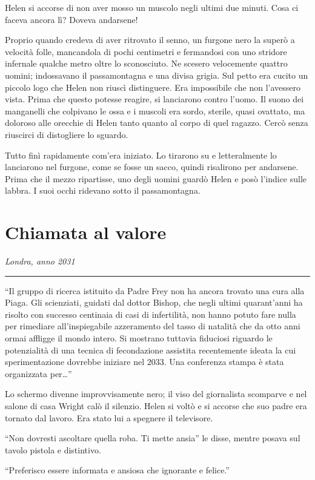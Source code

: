 \documentclass[a4paper,oneside,11pt]{memoir}
\begin{document}
Helen si accorse di non aver mosso un muscolo negli ultimi due minuti. Cosa ci faceva ancora lì?
Doveva andarsene!

Proprio quando credeva di aver ritrovato il senno, un furgone nero la superò a velocità folle,
mancandola di pochi centimetri e fermandosi con uno stridore infernale qualche metro oltre lo
sconosciuto. Ne scesero velocemente quattro uomini; indossavano il passamontagna e una divisa
grigia. Sul petto era cucito un piccolo logo che Helen non riuscì distinguere. Era impossibile che
non l'avessero vista. Prima che questo potesse reagire, si lanciarono contro l'uomo. Il suono dei
manganelli che colpivano le ossa e i muscoli era sordo, sterile, quasi ovattato, ma doloroso alle
orecchie di Helen tanto quanto al corpo di quel ragazzo. Cercò senza riuscirci di distogliere lo
sguardo.

Tutto finì rapidamente com'era iniziato. Lo tirarono su e letteralmente lo lanciarono nel furgone,
come se fosse un sacco, quindi risalirono per andarsene. Prima che il mezzo ripartisse, uno degli
uomini guardò Helen e posò l'indice sulle labbra. I suoi occhi ridevano sotto il passamontagna.

\chapter{Chiamata al valore}

\emph{Londra, anno 2031}
\plainbreak{1}

``Il gruppo di ricerca istituito da Padre Frey non ha ancora trovato una cura alla Piaga. Gli
scienziati, guidati dal dottor Bishop, che negli ultimi quarant'anni ha risolto con successo
centinaia di casi di infertilità, non hanno potuto fare nulla per rimediare all'inspiegabile
azzeramento del tasso di natalità che da otto anni ormai affligge il mondo intero. Si mostrano
tuttavia fiduciosi riguardo le potenzialità di una tecnica di fecondazione assistita recentemente
ideata la cui sperimentazione dovrebbe iniziare nel 2033. Una conferenza stampa è stata organizzata
per\dots''

Lo schermo divenne improvvisamente nero; il viso del giornalista scomparve e nel salone di casa
Wright calò il silenzio. Helen si voltò e si accorse che suo padre era tornato dal lavoro. Era stato
lui a spegnere il televisore.

``Non dovresti ascoltare quella roba. Ti mette ansia'' le disse, mentre posava sul tavolo pistola e
distintivo.

``Preferisco essere informata e ansiosa che ignorante e felice.''
\end{document}

